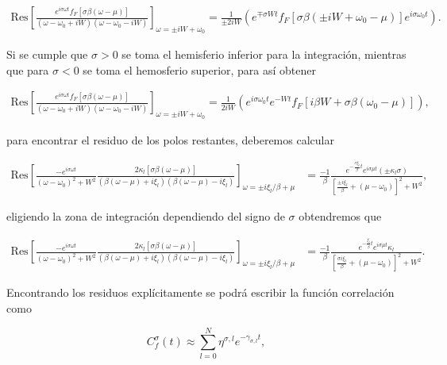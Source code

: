 \begin{appendixs}
\begin{align*}
   \text{Res} \left[ \frac{e^{ i\sigma \omega t} f_{F}[\sigma \beta (\omega-\mu)] }{ (\omega-\omega_{0} + iW)(\omega -\omega_{0} -iW)}\right]_{\omega = \pm i W + \omega_{0}} = \frac{1}{\pm 2iW} ( e^{\mp \sigma Wt} f_{F}[\sigma \beta(\pm iW +\omega_{0}-\mu)]e^{i\sigma \omega_{0}t}). 
\end{align*}

Si se cumple que $\sigma > 0$ se toma el hemisferio inferior para la integración, mientras que para $\sigma<0$ se toma el hemosferio superior, para así obtener 

\begin{align*}
    \text{Res} \left[ \frac{e^{ i\sigma \omega t} f_{F}[\sigma \beta (\omega-\mu)] }{ (\omega-\omega_{0} + iW)(\omega -\omega_{0} -iW)}\right]_{\omega = \pm i W + \omega_{0}} = \frac{1}{ 2iW} ( e^{i\sigma \omega_{0}t}e^{- Wt} f_{F}[i\beta W + \sigma \beta(\omega_{0}-\mu)]), 
 \end{align*}

para encontrar el residuo de los polos restantes, deberemos calcular 

\begin{align*}
    \text{Res} \left[ \frac{-e^{i\sigma \omega t}}{(\omega - \omega_{0})^{2} + W^{2} } \frac{ 2\kappa_{l}[\sigma \beta (\omega-\mu)] }{ (\beta(\omega-\mu) + i \xi_{l} )(\beta(\omega-\mu) - i \xi_{l})} \right]_{\omega = \pm i \xi_{l}/\beta + \mu} & = \frac{-1}{\beta} \frac{e^{- \frac{\sigma \xi_{l}}{\beta}t} e^{i\sigma \mu t}(\pm \kappa_{l}\sigma )}{ [ \frac{ \pm i\xi_{l}}{\beta} + (\mu - \omega_{0}) ]^{2} + W^{2} } ,
\end{align*}

eligiendo la zona de integración dependiendo del signo de $\sigma$ obtendremos que 

\begin{align*}
    \text{Res} \left[ \frac{-e^{i\sigma \omega t}}{(\omega - \omega_{0})^{2} + W^{2} } \frac{ 2\kappa_{l}[\sigma \beta (\omega-\mu)] }{ (\beta(\omega-\mu) + i \xi_{l} )(\beta(\omega-\mu) - i \xi_{l})} \right]_{\omega = \pm i \xi_{l}/\beta + \mu} & = \frac{-1}{\beta} \frac{e^{- \frac{ \xi_{l}}{\beta}t} e^{i\sigma \mu t} \kappa_{l} }{ [ \frac{ \sigma i\xi_{l}}{\beta} + (\mu - \omega_{0}) ]^{2} + W^{2} }. 
\end{align*}

Encontrando los residuos explícitamente se podrá escribir la función correlación como

\begin{equation}
    C^{\sigma}_{f}(t) \approx \sum_{l=0}^{N} \eta^{\sigma,l} e^{-\gamma_{\sigma,l} t},
    \label{correlationf}
\end{equation}


\end{appendixs}
